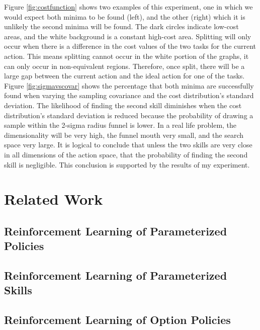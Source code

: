 \documentclass[12pt]{article}
\begin{document}
Figure \ref{fig:costfunction} shows two examples of this experiment, one in which we would expect both minima to be found (left), and the other (right) which it is unlikely the second minima will be found. The dark circles indicate low-cost areas, and the white background is a constant high-cost area. Splitting will only occur when there is a difference in the cost values of the two tasks for the current action. This means splitting cannot occur in the white portion of the graphs, it can only occur in non-equivalent regions. Therefore, once split, there will be a large gap between the current action and the ideal action for one of the tasks. Figure \ref{fig:sigmavscovar} shows the percentage that both minima are successfully found when varying the sampling covariance and the cost distribution's standard deviation. The likelihood of finding the second skill diminishes when the cost distribution's standard deviation is reduced because the probability of drawing a sample within the 2-sigma radius funnel is lower. In a real life problem, the dimensionality will be very high, the funnel mouth very small, and the search space very large. It is logical to conclude that unless the two skills are very close in all dimensions of the action space, that the probability of finding the second skill is negligible. This conclusion is supported by the results of my experiment.

\section{Related Work}
\label{sec:related_work}

\subsection{Reinforcement Learning of Parameterized Policies}

\citet{stulp12reinforcement}

\subsection{Reinforcement Learning of Parameterized Skills}

\citet{stulp13learning}
\citet{kupcsik13dataefficient}
\citet{marin12towards}
\citet{matsubara11learning}

\subsection{Reinforcement Learning of Option Policies}
\end{document}
